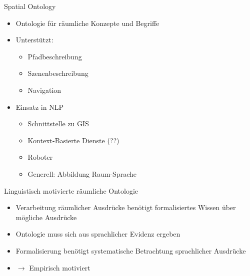 \documentclass[12pt,a4paper]{beamer}
\begin{document}
\begin{frame}{Spatial Ontology}
\begin{itemize}
\item Ontologie für räumliche Konzepte und Begriffe
\item Unterstützt:
\begin{itemize}
    \item Pfadbeschreibung
    \item Szenenbeschreibung
    \item Navigation
\end{itemize}
\item Einsatz in NLP
\begin{itemize}
    \item Schnittstelle zu GIS
    \item Kontext-Basierte Dienste (??)
    \item Roboter
    \item Generell: Abbildung Raum-Sprache
\end{itemize}
\end{itemize}
\end{frame}





\begin{frame}{Linguistisch motivierte räumliche Ontologie}
\begin{itemize}
\item Verarbeitung räumlicher Ausdrücke benötigt formalisiertes Wissen über mögliche Ausdrücke
\item Ontologie muss sich aus sprachlicher Evidenz ergeben
\item Formalisierung benötigt systematische Betrachtung sprachlicher Ausdrücke
\item $\to$ Empirisch motiviert
\end{itemize}
\end{frame}
\end{document}
